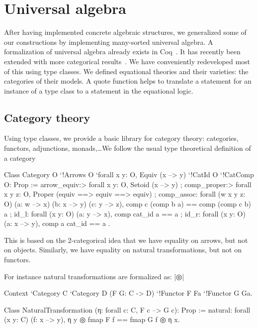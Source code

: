 \documentclass[a4paper,10pt, runningheads]{llncs}
\begin{document}
\section{Universal algebra}\label{univ}
After having implemented concrete algebraic structures, we generalized some of our constructions
by implementing many-sorted universal algebra. A formalization of universal algebra
already exists in Coq~\cite{DBLP:conf/tphol/Capretta99}. It has recently been extended with more
categorical results~\cite{dominguez2008formalizing}. We have conveniently redeveloped most of this
using type classes. We defined equational theories and their varieties:
the categories of their models. A quote function helps to translate a statement for an instance of
a type class to a statement in the equational logic.

\subsection{Category theory}\label{cats}
Using type classes, we provide a basic library for category theory: categories, functors,
adjunctions, monads,\ldots We follow the usual type theoretical definition of a category~\cite{saibi1995constructive}
\begin{code}
 Class Category O `{!Arrows O} `{forall x y: O, Equiv (x --> y)}
   `{!CatId O} `{!CatComp O}: Prop :=
  { arrow_equiv:> forall x y: O, Setoid (x --> y)
  ; comp_proper:> forall x y z: O,
      Proper (equiv ==> equiv ==> equiv)%
  ; comp_assoc: forall (w x y z: O) (a: w --> x) (b: x --> y) (c: y --> z),
      comp c (comp b a) == comp (comp c b) a
  ; id_l: forall (x y: O) (a: y --> x), comp cat_id a == a
  ; id_r: forall (x y: O) (a: x --> y), comp a cat_id == a }.
\end{code}
This is based on the 2-categorical idea that we have equality on arrows, but not on objects.
Similarly, we have equality on natural transformations, but not on functors.

For instance natural transformations are formalized as: |◎|
\begin{code}
  Context `{Category C} `{Category D} (F G: C -> D)
     `{!Functor F Fa} `{!Functor G Ga}.

  Class NaturalTransformation (η: forall c: C, F c --> G c): Prop :=
    natural: forall (x y: C) (f: x --> y), η y ◎ fmap F f == fmap G f ◎ η x.
\end{code}
\end{document}
